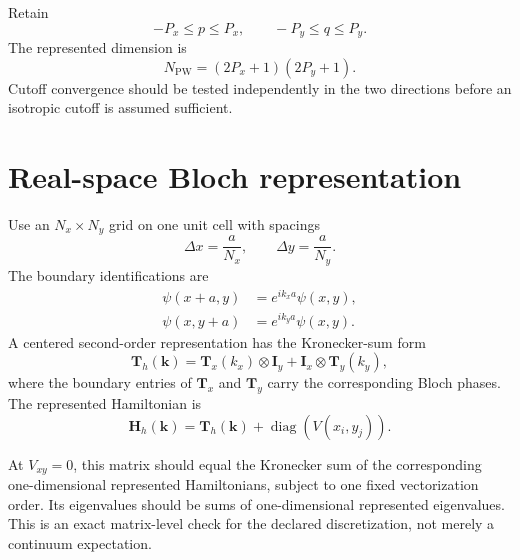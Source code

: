 Retain
\begin{equation}
    -P_x\leq p\leq P_x,
    \qquad
    -P_y\leq q\leq P_y.
\end{equation}
The represented dimension is
\begin{equation}
    N_{\mathrm{PW}}
    =
    (2P_x+1)(2P_y+1).
\end{equation}
Cutoff convergence should be tested independently in the two directions before
an isotropic cutoff is assumed sufficient.

\section*{Real-space Bloch representation}

Use an $N_x\times N_y$ grid on one unit cell with spacings
\begin{equation}
    \Delta x=\frac{a}{N_x},
    \qquad
    \Delta y=\frac{a}{N_y}.
\end{equation}
The boundary identifications are
\begin{align}
    \psi(x+a,y)&=e^{ik_xa}\psi(x,y),
    \\
    \psi(x,y+a)&=e^{ik_ya}\psi(x,y).
\end{align}
A centered second-order representation has the Kronecker-sum form
\begin{equation}
    \mathbf T_h(\mathbf k)
    =
    \mathbf T_x(k_x)\otimes\mathbf I_y
    +
    \mathbf I_x\otimes\mathbf T_y(k_y),
\end{equation}
where the boundary entries of $\mathbf T_x$ and $\mathbf T_y$ carry the
corresponding Bloch phases. The represented Hamiltonian is
\begin{equation}
    \mathbf H_h(\mathbf k)
    =
    \mathbf T_h(\mathbf k)
    +
    \operatorname{diag}
    \left(
        V(x_i,y_j)
    \right).
\end{equation}

At $V_{xy}=0$, this matrix should equal the Kronecker sum of the corresponding
one-dimensional represented Hamiltonians, subject to one fixed vectorization
order. Its eigenvalues should be sums of one-dimensional represented
eigenvalues. This is an exact matrix-level check for the declared discretization,
not merely a continuum expectation.

